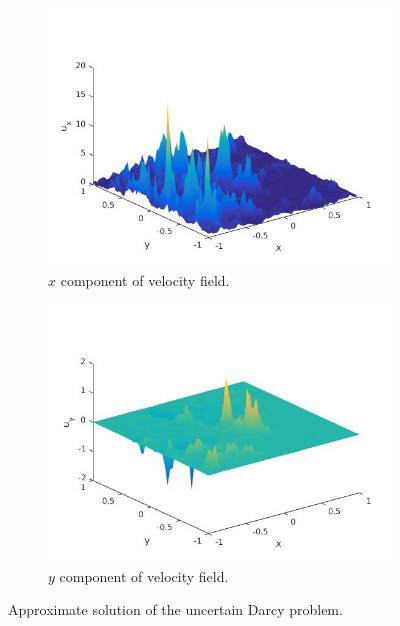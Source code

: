 \begin{figure}[t]
\begin{subfigure}{0.49\linewidth}
        \includegraphics [width=1\linewidth]{Darcy/Pictures/Ux.jpg}
        \caption{$x$ component of velocity field.}
        \label{fig:DarcyUx}
    \end{subfigure}
    \begin{subfigure}{0.49\linewidth}
        \centering
        \includegraphics [width=1\linewidth]{Darcy/Pictures/Uy.jpg}
        \caption{$y$ component of velocity field.}
        \label{fig:DarcyUy}
    \end{subfigure}    
    \caption{Approximate solution of the uncertain Darcy problem.}
    \label{fig:DarcyResults}
\end{figure}

